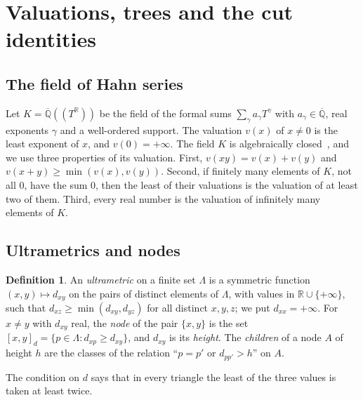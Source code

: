 \documentclass[11pt]{amsart}
\theoremstyle{definition}
\newtheorem{definition}[theorem]{Definition}
\theoremstyle{remark}
\numberwithin{equation}{section}
\newcommand{\Qbar}{\overline{\mathbb{Q}}}
\newcommand{\RR}{\mathbb{R}}
\newcommand{\nd}[2]{[#1]_{#2}}
\begin{document}
\section{Valuations, trees and the cut identities}\label{sec:val}

\subsection{The field of Hahn series} Let $K = \Qbar((T^{\RR}))$ be the field of the formal sums
$\sum_{\gamma} a_\gamma T^{\gamma}$ with $a_\gamma \in \Qbar$, real exponents $\gamma$ and a well-ordered
support. The valuation $v(x)$ of $x \ne 0$ is the least exponent of $x$, and $v(0) = +\infty$. The field
$K$ is algebraically closed~\cite[Theorem~1 and Corollary~4]{poonen1993}, and we use three properties
of its valuation. First, $v(xy) = v(x) + v(y)$ and $v(x + y) \ge \min(v(x), v(y))$. Second, if finitely many elements
of $K$, not all $0$, have the sum $0$, then the least of their valuations is the valuation of at least
two of them. Third, every real number is the valuation of infinitely many elements of $K$.

\subsection{Ultrametrics and nodes}

\begin{definition}\label{def:ultra}
An \emph{ultrametric} on a finite set $\Lambda$ is a symmetric function
$(x, y) \mapsto d_{xy}$ on the pairs of distinct elements of $\Lambda$, with values in
$\RR \cup \{+\infty\}$, such that $d_{xz} \ge \min(d_{xy}, d_{yz})$ for all distinct $x, y, z$; we put
$d_{xx} = +\infty$. For $x \ne y$ with $d_{xy}$ real, the \emph{node} of the pair $\{x, y\}$ is the set
$\nd{x, y}{d} = \{ p \in \Lambda : d_{xp} \ge d_{xy} \}$, and $d_{xy}$ is its \emph{height}. The
\emph{children} of a node $A$ of height $h$ are the classes of the relation ``$p = p'$ or $d_{pp'} > h$''
on $A$.
\end{definition}

The condition on $d$ says that in every triangle the least of the three values is taken at least twice.
\end{document}
